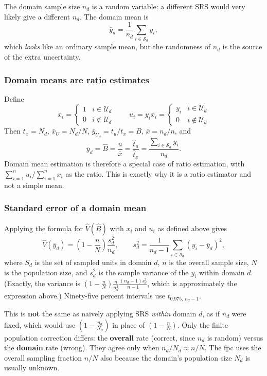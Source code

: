 \documentclass[
  letterpaper,
  DIV=11,
  numbers=noendperiod]{scrreprt}
\renewcommand{\[}{\begin{equation}}
\renewcommand{\]}{\end{equation}}
\begin{document}
The domain sample size \(n_d\) is a random variable: a different SRS
would very likely give a different \(n_d\). The domain mean is \[
\bar y_d = \frac{1}{n_d}\sum_{i \in \mathcal S_d} y_i ,
\] which \emph{looks} like an ordinary sample mean, but the randomness
of \(n_d\) is the source of the extra uncertainty.

\subsubsection{Domain means are ratio
estimates}\label{domain-means-are-ratio-estimates}

Define \[
x_i = \begin{cases}1 & i \in \mathcal U_d\\ 0 & i \notin \mathcal U_d\end{cases}
\qquad
u_i = y_ix_i = \begin{cases}y_i & i \in \mathcal U_d\\ 0 & i \notin \mathcal U_d\end{cases}
\] Then \(t_x = N_d\), \(\bar x_U = N_d/N\),
\(\bar y_{U_d} = t_u/t_x = B\), \(\bar x = n_d/n\), and \[
\bar y_d = \hat B = \frac{\bar u}{\bar x} = \frac{\hat t_u}{\hat t_x} = \frac{\sum_{i \in \mathcal S_d} y_i}{n_d} .
\] Domain mean estimation is therefore a special case of ratio
estimation, with \(\sum_{i=1}^n u_i/\sum_{i=1}^n x_i\) as the ratio.
This is exactly why it is a ratio estimator and not a simple mean.

\subsubsection{Standard error of a domain
mean}\label{standard-error-of-a-domain-mean}

Applying the formula for \(\hat V(\hat B)\) with \(x_i\) and \(u_i\) as
defined above gives \[
\boxed{\hat V(\bar y_d) = \left(1 - \frac nN\right)\frac{s_d^2}{n_d},
\qquad
s_d^2 = \frac{1}{n_d - 1}\sum_{i \in \mathcal S_d}\left(y_i - \bar y_d\right)^2},
\] where \(S_d\) is the set of sampled units in domain \(d\), \(n\) is
the overall sample size, \(N\) is the population size, and \(s_d^2\) is
the sample variance of the \(y_i\) within domain \(d\). (Exactly, the
variance is
\(\left(1 - \frac nN\right)\frac{n}{n_d^2}\frac{(n_d - 1)s_d^2}{n-1}\),
which is approximately the expression above.) Ninety-five percent
intervals use \(t_{0.975,\,n_d - 1}\).

This is \textbf{not} the same as naively applying SRS \emph{within}
domain \(d\), as if \(n_d\) were fixed, which would use
\(\left(1 - \frac{n_d}{N_d}\right)\) in place of
\(\left(1 - \frac nN\right)\). Only the finite population correction
differs: the \textbf{overall} rate (correct, since \(n_d\) is random)
versus the \textbf{domain} rate (wrong). They agree only when
\(n_d/N_d \approx n/N\). The fpc uses the overall sampling fraction
\(n/N\) also because the domain's population size \(N_d\) is usually
unknown.
\end{document}
